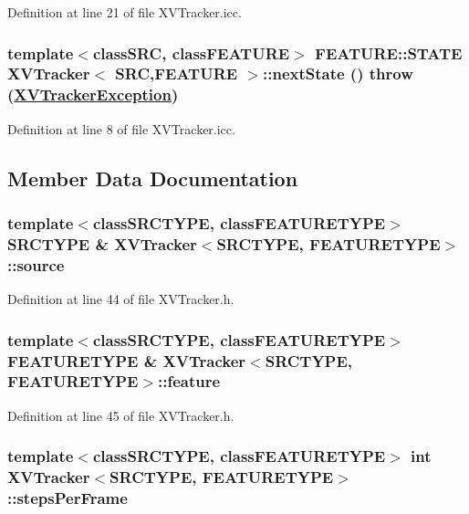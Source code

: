 Definition at line 21 of file XVTracker.icc.\label{XVTracker_a3}
\hypertarget{class_XVTracker_a3}{
\subsubsection[nextState]{\setlength{\rightskip}{0pt plus 5cm}template$<$classSRC, classFEATURE$>$ FEATURE::STATE XVTracker$<$ SRC,FEATURE $>$::next\-State ()  throw (\hyperlink{class_XVTrackerException}{XVTracker\-Exception})}}




Definition at line 8 of file XVTracker.icc.

\subsection{Member Data Documentation}
\label{XVTracker_n0}
\hypertarget{class_XVTracker_n0}{
\subsubsection[source]{\setlength{\rightskip}{0pt plus 5cm}template$<$classSRCTYPE, classFEATURETYPE$>$ SRCTYPE \& XVTracker$<$SRCTYPE, FEATURETYPE$>$::source}}




Definition at line 44 of file XVTracker.h.\label{XVTracker_n1}
\hypertarget{class_XVTracker_n1}{
\subsubsection[feature]{\setlength{\rightskip}{0pt plus 5cm}template$<$classSRCTYPE, classFEATURETYPE$>$ FEATURETYPE \& XVTracker$<$SRCTYPE, FEATURETYPE$>$::feature}}




Definition at line 45 of file XVTracker.h.\label{XVTracker_n2}
\hypertarget{class_XVTracker_n2}{
\subsubsection[stepsPerFrame]{\setlength{\rightskip}{0pt plus 5cm}template$<$classSRCTYPE, classFEATURETYPE$>$ int XVTracker$<$SRCTYPE, FEATURETYPE$>$::steps\-Per\-Frame}}




